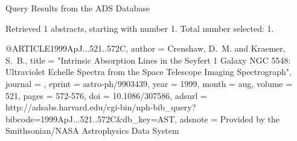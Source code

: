 Query Results from the ADS Database


Retrieved 1 abstracts, starting with number 1.  Total number selected: 1.

@ARTICLE{1999ApJ...521..572C,
   author = {{Crenshaw}, D.~M. and {Kraemer}, S.~B.},
    title = "{Intrinsic Absorption Lines in the Seyfert 1 Galaxy NGC 5548: Ultraviolet Echelle Spectra from the Space Telescope Imaging Spectrograph}",
  journal = {\apj},
   eprint = {astro-ph/9903439},
     year = 1999,
    month = aug,
   volume = 521,
    pages = {572-576},
      doi = {10.1086/307586},
   adsurl = {http://adsabs.harvard.edu/cgi-bin/nph-bib_query?bibcode=1999ApJ...521..572C&db_key=AST},
  adsnote = {Provided by the Smithsonian/NASA Astrophysics Data System}
}


